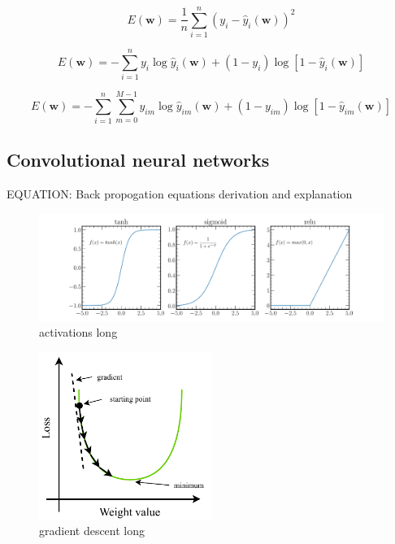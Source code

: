 \begin{equation} %
    E(\boldsymbol{w})=
    \frac{1}{n}\displaystyle\sum_{i=1}^{n}(y_{i}-
    \hat{y}_{i}(\boldsymbol{w}))^{2}
\end{equation}

\begin{equation} %
    E(\boldsymbol{w})=
    -\displaystyle\sum_{i=1}^{n}y_{i}\log\hat{y}_{i}(\boldsymbol{w})+
    (1-y_{i})\log[1-\hat{y}_{i}(\boldsymbol{w})]
\end{equation}

\begin{equation} %
    E(\boldsymbol{w})=
    -\displaystyle\sum_{i=1}^{n}\displaystyle\sum_{m=0}^{M-1}y_{im}\log\hat{y}_{im}
    (\boldsymbol{w})+(1-y_{im})\log[1-\hat{y}_{im}(\boldsymbol{w})]
\end{equation}

\subsection{Convolutional neural networks} %
\label{sec:cvn_theory_conv} %

EQUATION: Back propogation equations derivation and explanation

\begin{figure} %
    \includegraphics[width=\textwidth]{diagrams/7-cvn/activations.pdf}
    \caption[activations short]
    {activations long}
    \label{fig:activations}
\end{figure}

\begin{figure} %
    \includegraphics[width=0.5\textwidth]{diagrams/7-cvn/gradient_descent.pdf}
    \caption[gradient descent short]
    {gradient descent long}
    \label{fig:gradient_descent}
\end{figure}


